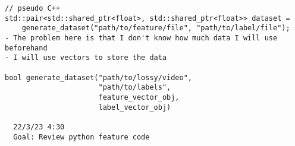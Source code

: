 \documentclass[12pt,oneside]{book}
\begin{document}
\begin{lstlisting}
// pseudo C++
std::pair<std::shared_ptr<float>, std::shared_ptr<float>> dataset = 
    generate_dataset("path/to/feature/file", "path/to/label/file");
- The problem here is that I don't know how much data I will use beforehand
- I will use vectors to store the data

bool generate_dataset("path/to/lossy/video",
                      "path/to/labels",
                      feature_vector_obj,
                      label_vector_obj)

  22/3/23 4:30
  Goal: Review python feature code
\end{lstlisting}

  \printbibliography[title={Bibliografía},heading=bibintoc]
\end{document}
